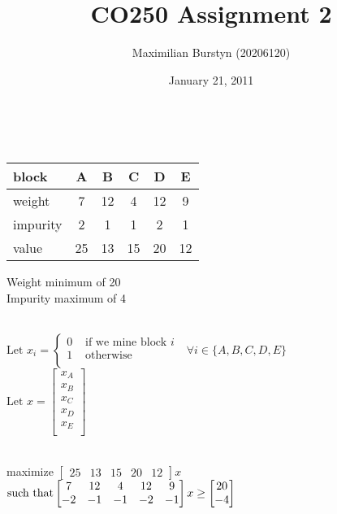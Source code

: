 \documentclass[12pt]{article}
\title{CO250 Assignment 2}
\author{Maximilian Burstyn (20206120)}
\date{January 21, 2011}
\begin{document}
\maketitle
{}
\begin{list}{Exercise .}{}

\item \hfill\\
\begin{tabular}{| l || c | c | c | c | c |} 
\hline
block & A & B & C & D & E \\
\hline
weight & 7 & 12 & 4 & 12 & 9 \\
impurity & 2 & 1 & 1 & 2 & 1 \\
value & 25 & 13 & 15 & 20 & 12 \\
\hline
\end{tabular}

Weight minimum of 20 \\
Impurity maximum of 4 \\

\begin{list}{()}{}

\item \hfill\\
\(
  \mbox{Let } x_i = 
  \begin{cases}
    0 & \mbox{ if we mine block $i$ } \\
    1 & \mbox{ otherwise } \\
  \end{cases}
  \forall i \in \{A, B, C, D, E\}
\) \\

\(
  \mbox{Let } x =
  \begin{bmatrix}
    x_A \\ x_B \\ x_C \\ x_D \\ x_E \\
  \end{bmatrix}
\)

\hfill \\

maximize $\begin{bmatrix} 25 & 13 & 15 & 20 & 12 \end{bmatrix} x$ \\

\(
  \mbox{such that} \\
  \begin{bmatrix}
     7 & 12 &  4 & 12 &  9 \\
    -2 & -1 & -1 & -2 & -1 \\
  \end{bmatrix}
  x \geq
  \begin{bmatrix}
    20 \\ -4 \\
  \end{bmatrix}
\) \\


\end{list}
\end{list}
\end{document}
